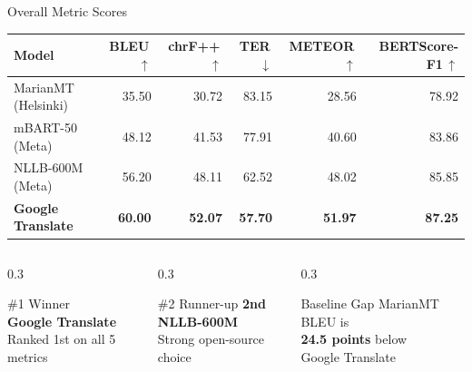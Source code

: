 \documentclass[aspectratio=169]{beamer}
\newcommand{\rowGold}{\rowcolor{mtgold!20}}
\begin{document}
\begin{frame}{Overall Metric Scores}
  \centering
  \renewcommand{\arraystretch}{1.4}
  \begin{tabular}{lrrrrr}
    \toprule
    \textbf{Model} & \textbf{BLEU\,$\uparrow$} & \textbf{chrF++\,$\uparrow$} & \textbf{TER\,$\downarrow$} & \textbf{METEOR\,$\uparrow$} & \textbf{BERTScore-F1\,$\uparrow$} \\
    \midrule
    MarianMT (Helsinki) & 35.50 & 30.72 & 83.15 & 28.56 & 78.92 \\
    mBART-50 (Meta)     & 48.12 & 41.53 & 77.91 & 40.60 & 83.86 \\
    NLLB-600M (Meta)    & 56.20 & 48.11 & 62.52 & 48.02 & 85.85 \\
    \rowGold
    \textbf{Google Translate} & \textbf{60.00} & \textbf{52.07} & \textbf{57.70} & \textbf{51.97} & \textbf{87.25} \\
    \bottomrule
  \end{tabular}
  \vspace{0.5cm}
  \begin{columns}
    \begin{column}{0.3\textwidth}
      \begin{block}{\centering \#1 Winner}
        \centering \textcolor{mtgold}{\large\textbullet}\\
        \textbf{Google Translate}\\
        Ranked 1st on all 5 metrics
      \end{block}
    \end{column}
    \begin{column}{0.3\textwidth}
      \begin{block}{\centering \#2 Runner-up}
        \centering \textcolor{mtaccent}{\large\textbf{2nd}}\\
        \textbf{NLLB-600M}\\
        Strong open-source choice
      \end{block}
    \end{column}
    \begin{column}{0.3\textwidth}
      \begin{alertblock}{\centering Baseline Gap}
        \centering MarianMT BLEU is\\
        \textbf{24.5 points} below\\
        Google Translate
      \end{alertblock}
    \end{column}
  \end{columns}
\end{frame}
\end{document}
